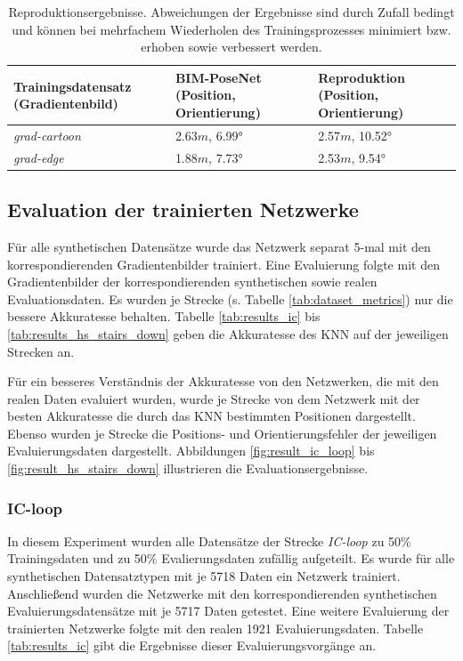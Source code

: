 \begin{table}
	\centering
	\caption{Reproduktionsergebnisse. Abweichungen der Ergebnisse sind durch Zufall bedingt und können bei mehrfachem Wiederholen des Trainingsprozesses minimiert bzw. erhoben sowie verbessert werden. }
	\begin{tabularx}{1.0\textwidth}{X X X}
		\textbf{Trainingsdatensatz} \hspace{2cm} (Gradientenbild) & \textbf{BIM-PoseNet} \hspace{2cm} (Position, Orientierung) & \textbf{Reproduktion} \hspace{2cm} (Position, Orientierung)\\
		\hline
	 \textit{grad-cartoon} & 2.63$m$, 6.99° & 2.57$m$, 10.52°\\
		\hline
		\textit{grad-edge} & 1.88$m$, 7.73°  & 2.53$m$, 9.54°\\
	\end{tabularx}
	\label{tab:reproduction}
\end{table}





\subsection{Evaluation der trainierten Netzwerke}
Für alle synthetischen Datensätze wurde das Netzwerk separat 5-mal mit den korrespondierenden Gradientenbilder trainiert. Eine Evaluierung folgte mit den Gradientenbilder der korrespondierenden synthetischen sowie realen Evaluationsdaten. Es wurden je Strecke (s. Tabelle \ref{tab:dataset_metrics})  nur die bessere Akkuratesse behalten. Tabelle \ref{tab:results_ic} bis \ref{tab:results_hs_stairs_down} geben die Akkuratesse des KNN auf der jeweiligen Strecken an. 


Für ein besseres Verständnis der Akkuratesse von den Netzwerken, die mit den realen Daten evaluiert wurden, wurde je Strecke von dem Netzwerk mit der besten Akkuratesse die durch das KNN bestimmten Positionen dargestellt. Ebenso wurden je Strecke die Positions- und Orientierungsfehler der jeweiligen Evaluierungsdaten dargestellt. Abbildungen \ref{fig:result_ic_loop} bis \ref{fig:result_hs_stairs_down} illustrieren die Evaluationsergebnisse.


\subsubsection{IC-loop}
In diesem Experiment wurden alle Datensätze der Strecke \textit{IC-loop} zu 50\% Trainingsdaten und zu 50\% Evalierungsdaten zufällig aufgeteilt. Es wurde für alle synthetischen Datensatztypen mit je 5718 Daten ein Netzwerk trainiert. Anschließend wurden die Netzwerke mit den korrespondierenden synthetischen Evaluierungsdatensätze mit je 5717 Daten getestet. Eine weitere Evaluierung der trainierten Netzwerke folgte mit den realen 1921 Evaluierungsdaten. Tabelle \ref{tab:results_ic} gibt die Ergebnisse dieser Evaluierungsvorgänge an.

